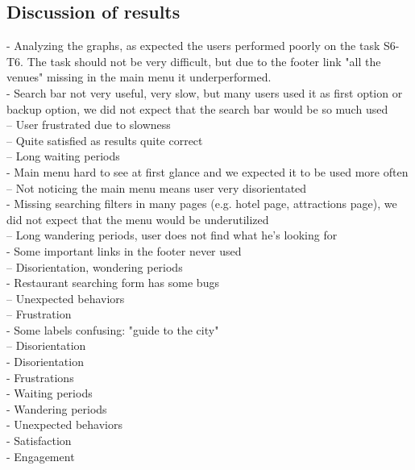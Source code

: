 \subsection{Discussion of results}
    - Analyzing the graphs, as expected the users performed poorly on the task S6-T6. The task should not be very difficult, but due to the footer link "all the venues" missing in the main menu it underperformed.\\
    - Search bar not very useful, very slow, but many users used it as first option or backup option, we did not expect that the search bar would be so much used\\
        -- User frustrated due to slowness\\
        -- Quite satisfied as results quite correct\\
        -- Long waiting periods\\
    - Main menu hard to see at first glance and we expected it to be used more often\\
        -- Not noticing the main menu means user very disorientated\\
    - Missing searching filters in many pages (e.g. hotel page, attractions page), we did not expect that the menu would be underutilized\\
        -- Long wandering periods, user does not find what he's looking for\\
    - Some important links in the footer never used\\
        -- Disorientation, wondering periods\\
    - Restaurant searching form has some bugs\\
        -- Unexpected behaviors\\
        -- Frustration\\
    - Some labels confusing: "guide to the city"\\
        -- Disorientation\\



    - Disorientation\\
    - Frustrations\\
    - Waiting periods\\
    - Wandering periods\\
    - Unexpected behaviors\\
    - Satisfaction\\
    - Engagement\\